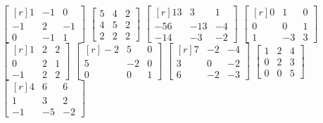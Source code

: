 \begin{tasks}[
    style=enumerate,
    label-offset = 3mm,
    ]
    \task $\begin{bmatrix*}[r]1 & -1 & 0 \\ -1 & 2 & -1 \\ 0 & -1 & 1\end{bmatrix*}$
    \task $\begin{bmatrix*}5 & 4 & 2 \\ 4 & 5 & 2 \\ 2 & 2 & 2\end{bmatrix*}$
    \task $\begin{bmatrix*}[r]13 & 3 & 1 \\ -56 & -13 & -4 \\ -14 & -3 & -2\end{bmatrix*}$
    \task $\begin{bmatrix*}[r]0 & 1 & 0 \\ 0 & 0 & 1 \\ 1 & -3 & 3\end{bmatrix*}$
    \task $\begin{bmatrix*}[r]1 & 2 & 2 \\ 0 & 2 & 1 \\ -1 & 2 & 2\end{bmatrix*}$
    \task $\begin{bmatrix*}[r]-2 & 5 & 0 \\ 5 & -2 & 0 \\ 0 & 0 & 1\end{bmatrix*}$
    \task $\begin{bmatrix*}[r]7 & -2 & -4 \\ 3 & 0 & -2 \\ 6 & -2 & -3\end{bmatrix*}$
    \task $\begin{bmatrix*}1 & 2 & 4 \\ 0 & 2 & 3 \\ 0 & 0 & 5\end{bmatrix*}$
    \task $\begin{bmatrix*}[r]4 & 6 & 6 \\ 1 & 3 & 2 \\ -1 & -5 & -2\end{bmatrix*}$

\end{tasks}
